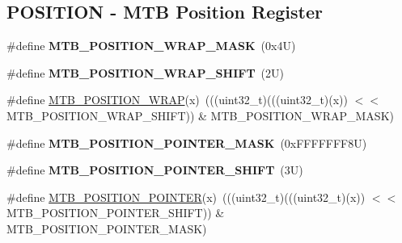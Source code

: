\subsection*{P\+O\+S\+I\+T\+I\+ON -\/ M\+TB Position Register}
\begin{DoxyCompactItemize}
\item 
\mbox{\label{group___m_t_b___register___masks_ga78e2e577559e338f1c3b58cc1cc63805}} 
\#define {\bfseries M\+T\+B\+\_\+\+P\+O\+S\+I\+T\+I\+O\+N\+\_\+\+W\+R\+A\+P\+\_\+\+M\+A\+SK}~(0x4\+U)
\item 
\mbox{\label{group___m_t_b___register___masks_gab3f7a88c57218b9c54796e7d2f41ac2f}} 
\#define {\bfseries M\+T\+B\+\_\+\+P\+O\+S\+I\+T\+I\+O\+N\+\_\+\+W\+R\+A\+P\+\_\+\+S\+H\+I\+FT}~(2\+U)
\item 
\#define \mbox{\hyperlink{group___m_t_b___register___masks_gabee49679e5e9849843089e63f5f724bf}{M\+T\+B\+\_\+\+P\+O\+S\+I\+T\+I\+O\+N\+\_\+\+W\+R\+AP}}(x)~(((uint32\+\_\+t)(((uint32\+\_\+t)(x)) $<$$<$ M\+T\+B\+\_\+\+P\+O\+S\+I\+T\+I\+O\+N\+\_\+\+W\+R\+A\+P\+\_\+\+S\+H\+I\+FT)) \& M\+T\+B\+\_\+\+P\+O\+S\+I\+T\+I\+O\+N\+\_\+\+W\+R\+A\+P\+\_\+\+M\+A\+SK)
\item 
\mbox{\label{group___m_t_b___register___masks_gadb8fe67da29e5443d81624d913c6a5da}} 
\#define {\bfseries M\+T\+B\+\_\+\+P\+O\+S\+I\+T\+I\+O\+N\+\_\+\+P\+O\+I\+N\+T\+E\+R\+\_\+\+M\+A\+SK}~(0x\+F\+F\+F\+F\+F\+F\+F8\+U)
\item 
\mbox{\label{group___m_t_b___register___masks_ga7857f68d5a75794dbf744b3c484f782f}} 
\#define {\bfseries M\+T\+B\+\_\+\+P\+O\+S\+I\+T\+I\+O\+N\+\_\+\+P\+O\+I\+N\+T\+E\+R\+\_\+\+S\+H\+I\+FT}~(3\+U)
\item 
\#define \mbox{\hyperlink{group___m_t_b___register___masks_ga6521f4d89fa83ad4b901b931b36b2415}{M\+T\+B\+\_\+\+P\+O\+S\+I\+T\+I\+O\+N\+\_\+\+P\+O\+I\+N\+T\+ER}}(x)~(((uint32\+\_\+t)(((uint32\+\_\+t)(x)) $<$$<$ M\+T\+B\+\_\+\+P\+O\+S\+I\+T\+I\+O\+N\+\_\+\+P\+O\+I\+N\+T\+E\+R\+\_\+\+S\+H\+I\+FT)) \& M\+T\+B\+\_\+\+P\+O\+S\+I\+T\+I\+O\+N\+\_\+\+P\+O\+I\+N\+T\+E\+R\+\_\+\+M\+A\+SK)
\end{DoxyCompactItemize}
